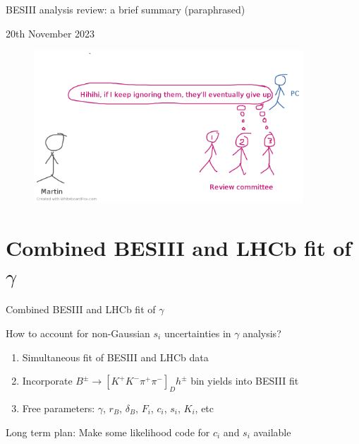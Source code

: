 \documentclass{beamer}
\begin{document}
\begin{frame}{BESIII analysis review: a brief summary (paraphrased)}
  \begin{center}
    {\large 20th November 2023\phantom{p}}
  \end{center}
  \begin{figure}
    \includegraphics[width=0.9\textwidth,trim={0 0 0 0.5cm},clip=true]{Plots/BESIII_review_process_13.png}
  \end{figure}
\end{frame}

\section{Combined BESIII and LHCb fit of \texorpdfstring{$\gamma$}{gamma}}

\begin{frame}{Combined BESIII and LHCb fit of $\gamma$}
  \begin{center}
    {\large How to account for non-Gaussian $s_i$ uncertainties in $\gamma$ analysis?}
  \end{center}
  \begin{enumerate}
    \setlength\itemsep{1.0em}
    \item{Simultaneous fit of BESIII and LHCb data}
    \item{Incorporate $B^\pm\to[K^+K^-\pi^+\pi^-]_Dh^\pm$ bin yields into BESIII fit}
    \item{Free parameters: $\gamma$, $r_B$, $\delta_B$, $F_i$, $c_i$, $s_i$, $K_i$, etc}
  \end{enumerate}
  \vspace{0.7cm}
  \begin{center}
    {\large Long term plan: Make some likelihood code for $c_i$ and $s_i$ available}
  \end{center}
\end{frame}
\end{document}
